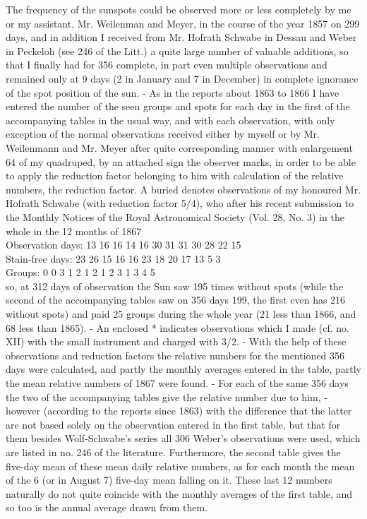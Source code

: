 \documentclass[12pt]{article}
\begin{document}
The frequency of the sunspots could be observed more or less completely by me or my assistant, Mr. Weilenman and Meyer, in the course of the year 1857 on 299 days, and in addition I received from Mr. Hofrath Schwabe in Dessau and Weber in Peckeloh (see 246 of the Litt.) a quite large number of valuable additions, so that I finally had for 356 complete, in part even multiple observations and remained only at 9 days (2 in January and 7 in December) in complete ignorance of the spot position of the sun. - As in the reports about 1863 to 1866 I have entered the number of the seen groups and spots for each day in the first of the accompanying tables in the usual way, and with each observation, with only exception of the normal observations received either by myself or by Mr. Weilenmann and Mr. Meyer after quite corresponding manner with enlargement 64 of my quadruped, by an attached sign the observer marks, in order to be able to apply the reduction factor belonging to him with calculation of the relative numbers, the reduction factor. A buried \dag denotes observations of my honoured Mr. Hofrath Schwabe (with reduction factor 5/4), who after his recent submission to the Monthly Notices of the Royal Astronomical Society (Vol. 28, No. 3) in the whole in the 12 months of 1867\\

Observation days: 13 16 16 14 16 30 31 31 30 28 22 15\\
Stain-free days: 23 26 15 16 16 23 18 20 17 13 5 3\\
Groups: 0 0 3 1 2 1 2 1 2 3 1 3 4 5\\

so, at 312 days of observation the Sun saw 195 times without spots (while the second of the accompanying tables saw on 356 days 199, the first even has 216 without spots) and paid 25 groups during the whole year (21 less than 1866, and 68 less than 1865). - An enclosed * indicates observations which I made (cf. no. XII) with the small instrument and charged with 3/2. - With the help of these observations and reduction factors the relative numbers for the mentioned 356 days were calculated, and partly the monthly averages entered in the table, partly the mean relative numbers of 1867 were found. - For each of the same 356 days the two of the accompanying tables give the relative number due to him, - however (according to the reports since 1863) with the difference that the latter are not based solely on the observation entered in the first table, but that for them besides Wolf-Schwabe's series all 306 Weber's observations were used, which are listed in no. 246 of the literature. Furthermore, the second table gives the five-day mean of these mean daily relative numbers, as for each month the mean of the 6 (or in August 7) five-day mean falling on it. These last 12 numbers naturally do not quite coincide with the monthly averages of the first table, and so too is the annual average drawn from them. \\
\end{document}
